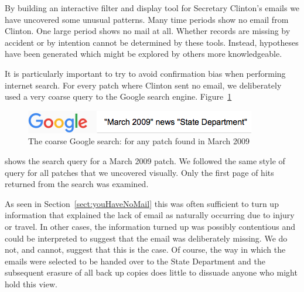 \documentclass[journal]{vgtc}                %
\begin{document}
By building an interactive filter and display tool for Secretary Clinton's emails we have uncovered some unusual patterns.  Many time periods show no email from Clinton.  One large period shows no mail at all.  Whether records are missing by accident or by intention cannot be determined by these tools. 
Instead, hypotheses have been generated which might be explored by others more knowledgeable.

It is particularly important to try to avoid confirmation bias when performing internet search.  For every patch where Clinton sent no email, we deliberately used a very coarse query to the Google search engine.   
Figure~\ref{fig:googleSearch}
\begin{figure}[h]
\begin{center}
\includegraphics[width=0.75\linewidth]{googleSearch}
\caption{The coarse Google search: for any patch found in March 2009}
\label{fig:googleSearch}
\end{center}
\end{figure}
shows the search query for a March 2009 patch.  We followed the same style of query for all patches that we uncovered visually.  Only the first page of hits returned from the search was examined.

As seen in Section~\ref{sect:youHaveNoMail} this was often sufficient to turn up information that explained the lack of email as naturally occurring due to injury or travel.  In other cases, the information turned up was possibly contentious and could be interpreted to suggest that the email was deliberately missing.  We do not, and cannot, suggest that this is the case.  Of course, the way in which the emails were selected to be handed over to the State Department and the subsequent erasure of all back up copies does little to dissuade anyone who might hold this view.
\end{document}
